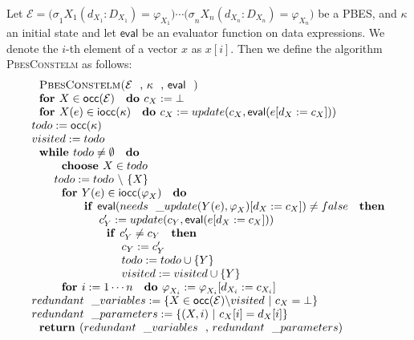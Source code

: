 \documentclass{article}
\begin{document}
Let $\mathcal{E=(\sigma }_{1}X_{1}(d_{X_{1}}:D_{X_{1}})=\varphi
_{X_{1}})\cdots \mathcal{(\sigma }_{n}X_{n}(d_{X_{n}}:D_{X_{n}})=\varphi
_{X_{n}})$ be a PBES, and $\kappa $ an initial state and let $\mathsf{eval}$
be an evaluator function on data expressions. We denote the $i$-th element
of a vector $x$ as $x[i]$. Then we define the algorithm \textsc{PbesConstelm}
as follows:$\qquad \qquad $%
\begin{equation*}
\begin{array}{l}
\text{\textsc{PbesConstelm(}}\mathcal{E}\text{, }\kappa \text{, }\mathsf{eval%
}\text{\textsc{)}} \\
\text{\textbf{for }}X\in \mathsf{occ}(\mathcal{E)}\text{ \textbf{do }}%
c_{X}:=\bot \\
\text{\textbf{for }}X(e)\in \mathsf{iocc}(\kappa \mathcal{)}\text{ \textbf{%
do }}c_{X}:=update(c_{X},\mathsf{eval}(e[d_{X}:=c_{X}])) \\
todo:=\mathsf{occ}(\kappa \mathcal{)} \\
visited:=todo \\
\text{\textbf{while }}todo\neq \emptyset \text{ \textbf{do}} \\
\qquad \text{\textbf{choose }}X\in todo \\
\qquad todo:=todo\ \backslash \ \{X\} \\
\qquad \text{\textbf{for }}Y(e)\in \mathsf{iocc}(\varphi _{X}\mathcal{)}%
\text{ \textbf{do}} \\
\qquad \qquad \text{\textbf{if }}\mathsf{eval}(needs\_update(Y(e),\varphi
_{X})[d_{X}:=c_{X}])\neq false\text{ \textbf{then}} \\
\qquad \qquad \qquad c_{Y}^{\prime }:=update(c_{Y},\mathsf{eval}%
(e[d_{X}:=c_{X}])) \\
\qquad \qquad \qquad \text{\textbf{if }}c_{Y}^{\prime }\neq c_{Y}\text{
\textbf{then}} \\
\qquad \qquad \qquad \qquad c_{Y}:=c_{Y}^{\prime } \\
\qquad \qquad \qquad \qquad todo:=todo\cup \{Y\} \\
\qquad \qquad \qquad \qquad visited:=visited\cup \{Y\} \\
\qquad \text{\textbf{for }}i:=1\cdots n\text{ \textbf{do }}\varphi
_{X_{i}}:=\varphi _{X_{i}}[d_{X_{i}}:=c_{X_{i}}] \\
redundant\_variables:=\{X\in \mathsf{occ}(\mathcal{E)\setminus }visited\ |\
c_{X}=\bot \} \\
redundant\_parameters:=\{(X,i)\ |\ c_{X}[i]=d_{X}[i]\} \\
\text{\textbf{return }}(redundant\_variables\text{, }redundant\_parameters)%
\end{array}%
\end{equation*}
\end{document}
